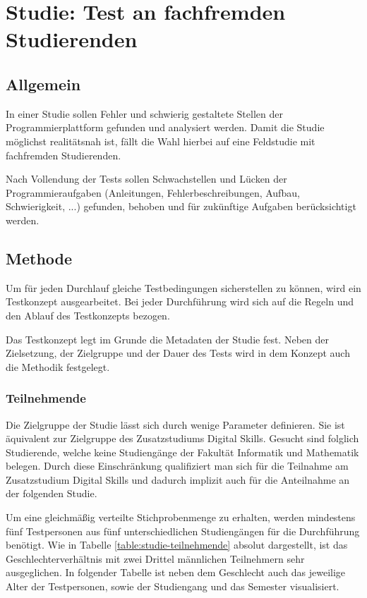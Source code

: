 \section{Studie: Test an fachfremden Studierenden}\label{studie}
\subsection{Allgemein}
In einer Studie sollen Fehler und schwierig gestaltete Stellen der
Programmierplattform gefunden und analysiert werden. Damit die Studie möglichst
realitätsnah ist, fällt die Wahl hierbei auf eine Feldstudie mit fachfremden
Studierenden. \parencite{feldstudie}

Nach Vollendung der Tests sollen Schwachstellen und Lücken der
Programmieraufgaben (Anleitungen, Fehlerbeschreibungen, Aufbau, Schwierigkeit,
...) gefunden, behoben und für zukünftige Aufgaben berücksichtigt werden.
\parencite{studie-testkonzept}

\subsection{Methode}
Um für jeden Durchlauf gleiche Testbedingungen sicherstellen zu können, wird ein
Testkonzept ausgearbeitet. Bei jeder Durchführung wird sich auf die Regeln
und den Ablauf des Testkonzepts bezogen.

Das Testkonzept legt im Grunde die Metadaten der Studie fest. Neben der
Zielsetzung, der Zielgruppe und der Dauer des Tests wird in dem Konzept auch die
Methodik festgelegt.

\subsubsection{Teilnehmende}
Die Zielgruppe der Studie lässt sich durch wenige Parameter definieren. Sie
ist äquivalent zur Zielgruppe des Zusatzstudiums Digital Skills. Gesucht sind
folglich Studierende, welche keine Studiengänge der Fakultät Informatik und
Mathematik belegen. Durch diese Einschränkung qualifiziert man sich für die
Teilnahme am Zusatzstudium Digital Skills und dadurch implizit auch für die
Anteilnahme an der folgenden Studie.

Um eine gleichmäßig verteilte Stichprobenmenge zu erhalten, werden mindestens
fünf Testpersonen aus fünf unterschiedlichen Studiengängen für die Durchführung
benötigt. Wie in Tabelle \ref{table:studie-teilnehmende} absolut dargestellt,
ist das Geschlechterverhältnis mit zwei Drittel männlichen Teilnehmern sehr
ausgeglichen. In folgender Tabelle ist neben dem Geschlecht auch das jeweilige
Alter der Testpersonen, sowie der Studiengang und das Semester visualisiert.

